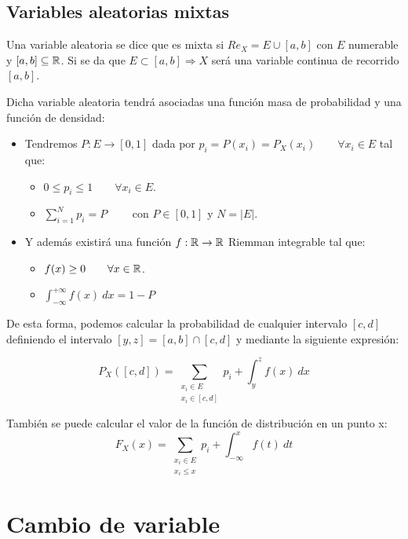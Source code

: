 \subsection{Variables aleatorias mixtas}

\begin{definicion}
    Una variable aleatoria se dice que es mixta si $Re_X = E \cup [a,b]$ con $E$ numerable y $[a,b]\subseteq \mathbb R$.
    Si se da que $E \subset [a,b] \Rightarrow X$ será una variable continua de recorrido $[a,b]$.
\end{definicion}

Dicha variable aleatoria tendrá asociadas una función masa de probabilidad y una función de densidad:
\begin{itemize}
    \item Tendremos $P:E\rightarrow [0,1]$ dada por $p_i = P(x_i) = P_X(x_i) \qquad \forall x_i \in E$ tal que:
    \begin{itemize}
      \item $0 \leq p_i \leq 1 \qquad \forall x_i \in E$.
      \item $\sum\limits_{i=1}^N p_i = P \qquad $ con $P\in [0,1]$ y $N=|E|$.
    \end{itemize}
    
    \item Y además existirá una función $f:\mathbb R \rightarrow \mathbb R$ Riemman integrable tal que:
    \begin{itemize}
      \item $f(x) \geq 0 \qquad \forall x \in \mathbb R$.
      \item $\displaystyle \int_{-\infty}^{+\infty} f(x)~dx = 1-P$
    \end{itemize}
\end{itemize}

\bigskip

De esta forma, podemos calcular la probabilidad de cualquier intervalo $[c,d]$ definiendo el intervalo $[y,z] = [a,b] \cap [c,d]$ y mediante la siguiente expresión:

$$P_X([c,d]) = \sum_{\substack{x_i \in E \\ x_i \in [c,d]}} p_i + \int_y^z f(x)~dx $$

También se puede calcular el valor de la función de distribución en un punto x:
$$F_X(x) = \sum_{\substack{x_i \in E \\ x_i \leq x}} p_i + \int_{-\infty}^x f(t)~dt$$

\section{Cambio de variable}

